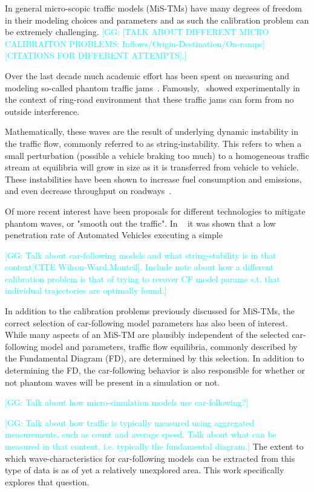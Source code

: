 \documentclass[english,titlepage,oneside,12pt]{article}
\newcommand{\kibitz}[2]{\ifnum\Comments=1\textcolor{#1}{#2}\fi}
\newcommand{\George}[1]{\kibitz{cyan}      {[GG: #1]}}
\begin{document}
In general micro-scopic traffic models (MiS-TMs) have many degrees of freedom in their modeling choices and parameters and as such the calibration problem can be extremely challenging. \George{[TALK ABOUT DIFFERENT MICRO CALIBRAITON PROBLEMS: Inflows/Origin-Destination/On-ramps][CITATIONS FOR DIFFERENT ATTEMPTS].}  

Over the last decade much academic effort has been spent on measuring and modeling so-called phantom traffic jams~\cite{Sugiyamaetal2008,treiber2000congested}. Famously,~\cite{Sugiyamaetal2008} showed experimentally in the context of ring-road environment that these traffic jams can form from no outside interference.

Mathematically, these waves are the result of underlying dynamic instability in the traffic flow, commonly referred to as string-instability. This refers to when a small perturbation (possible a vehicle braking too much) to a homogeneous traffic stream at equilibria will grow in size as it is transferred from vehicle to vehicle. These instabilities have been shown to increase fuel consumption and emissions, and even decrease throughput on roadways~\cite{stern2018emissions,wu2018tracking}.

Of more recent interest have been proposals for different technologies to mitigate phantom waves, or "smooth out the traffic". In ~\cite{stern2017dissipation} it was shown that a low penetration rate of Automated Vehicles executing a simple 

\George{Talk about car-following models and what string-stability is in that context[CITE Wilson-Ward,Monteil]. Include note about how a different calibration problem is that of trying to recover CF model params s.t. that individual trajectories are optimally found.}

In addition to the calibration problems previously discussed for MiS-TMs, the correct selection of car-following model parameters has also been of interest. While many aspects of an MiS-TM are plausibly independent of the selected car-following model and parameters, traffic flow equilibria, commonly described by the Fundamental Diagram (FD), are determined by this selection. In addition to determining the FD, the car-following behavior is also responsible for whether or not phantom waves will be present in a simulation or not.

\George{Talk about how micro-simulation models use car-following?}

\George{Talk about how traffic is typically measured using aggregated measurements, such as count and average speed. Talk about what can be measured in that context, i.e. typically the fundamental diagram.} The extent to which wave-characteristics for car-following models can be extracted from this type of data is as of yet a relatively unexplored area. This work specifically explores that question.
\end{document}
